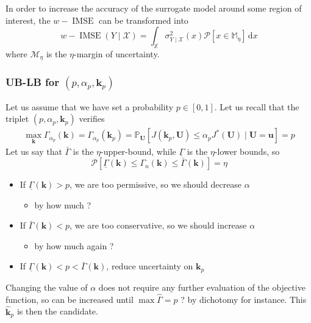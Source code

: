 \documentclass[a4paper,11pt]{article}
\newcommand{\Prob}{\mathbb{P}}
\newcommand{\ProbGP}{\mathcal{P}}
\newcommand{\Xspace}{\mathbb{X}}
\DeclareMathOperator{\IMSE}{IMSE}
\begin{document}
In order to increase the accuracy of the surrogate model around some region of interest, the $w-\IMSE$ can be transformed into
\begin{equation}
  w-\IMSE(Y\mid \mathcal{X}) = \int_{\Xspace} \sigma_{Y\mid\mathcal{X}}^2(x)\ProbGP\left[x \in \mathbb{M}_{\eta}\right]\,\mathrm{d}x
\end{equation}
where $\mathcal{M}_{\eta}$ is the $\eta$-margin of uncertainty.

\subsubsection{UB-LB for $(p, \alpha_p, \mathbf{k}_p)$}
Let us assume that we have set a probability $p\in [0,1]$. Let us recall that the triplet $(p, \alpha_p, \mathbf{k}_p)$ verifies
\begin{align}
  \max_{\mathbf{k}} \Gamma_{\alpha_p}(\mathbf{k}) = \Gamma_{\alpha_p}(\mathbf{k}_p) = \Prob_{\mathbf{U}}\left[J(\mathbf{k}_p,\mathbf{U}) \leq \alpha_p J^*(\mathbf{U})\mid \mathbf{U} = \mathbf{u}\right] = p
\end{align}
Let us say that $\bar{\Gamma}$ is the $\eta$-upper-bound, while $\underline{\Gamma}$ is the $\eta$-lower bounds, so
\begin{equation}
  \ProbGP\left[\underline{\Gamma}(\mathbf{k}) \leq \Gamma_n(\mathbf{k}) \leq \bar{\Gamma}(\mathbf{k})\right] = \eta
\end{equation}
\begin{itemize}
\item If $\underline{\Gamma}(\mathbf{k})>p$, we are too permissive, so we should decrease $\alpha$
  \begin{itemize}
  \item by how much ?
  \end{itemize}
\item If $\bar{\Gamma}(\mathbf{k})<p$, we are too conservative, so we should increase $\alpha$
  \begin{itemize}
  \item by how much again ?
  \end{itemize}
 \item If $\underline{\Gamma}(\mathbf{k})<p<\bar{\Gamma}(\mathbf{k})$, reduce uncertainty on $\mathbf{k}_p$
\end{itemize}
Changing the value of $\alpha$ does not require any further evaluation of the objective function, so can be increased until $\max \hat{\Gamma} = p$ ? by dichotomy for instance. This $\hat{\mathbf{k}}_p$ is then the candidate.
\end{document}
